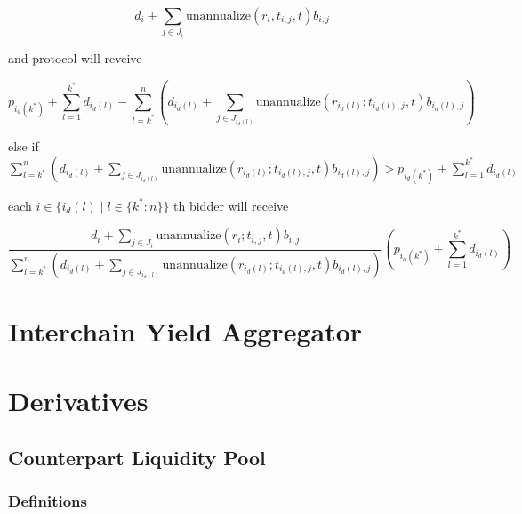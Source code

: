 \documentclass[dvipdfmx]{jsarticle}
\begin{document}
$$
  d_i + \sum_{j \in J_i} \text{unannualize}(r_i, t_{i,j}, t) b_{i,j}
$$

and protocol will reveive

$$
  p_{i_d(k^*)} + \sum_{l=1}^{k^*} d_{i_d(l)} - \sum_{l=k^*}^n \left(d_{i_d(l)} + \sum_{j \in J_{i_d(l)}} \text{unannualize}(r_{i_d(l)}; t_{i_d(l),j}, t) b_{i_d(l),j} \right)
$$

else if $\sum_{l=k^*}^n \left(d_{i_d(l)} + \sum_{j \in J_{i_d(l)}} \text{unannualize}(r_{i_d(l)}; t_{i_d(l),j}, t) b_{i_d(l),j} \right) > p_{i_d(k^*)} + \sum_{l=1}^{k^*} d_{i_d(l)}$

each $i \in \{i_d(l) \mid l \in \{k^*:n\}\}$ th bidder will receive

$$
  \frac{d_i + \sum_{j \in J_i} \text{unannualize}(r_i; t_{i,j}, t) b_{i,j}}{\sum_{l=k^*}^n \left(d_{i_d(l)} + \sum_{j \in J_{i_d(l)}} \text{unannualize}(r_{i_d(l)}; t_{i_d(l),j}, t) b_{i_d(l),j} \right)} \left( p_{i_d(k^*)} + \sum_{l=1}^{k^*} d_{i_d(l)} \right)
$$

\section{Interchain Yield Aggregator}

\section{Derivatives}

\subsection{Counterpart Liquidity Pool}

\subsubsection{Definitions}
\end{document}
